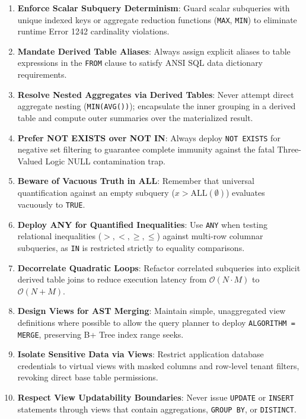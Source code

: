 \documentclass[10pt,twocolumn,letterpaper]{article}
\begin{document}
\begin{enumerate}
    \item \textbf{Enforce Scalar Subquery Determinism}: Guard scalar subqueries with unique indexed keys or aggregate reduction functions (\texttt{MAX}, \texttt{MIN}) to eliminate runtime Error 1242 cardinality violations.
    \item \textbf{Mandate Derived Table Aliases}: Always assign explicit aliases to table expressions in the \texttt{FROM} clause to satisfy ANSI SQL data dictionary requirements.
    \item \textbf{Resolve Nested Aggregates via Derived Tables}: Never attempt direct aggregate nesting (\texttt{MIN(AVG())}); encapsulate the inner grouping in a derived table and compute outer summaries over the materialized result.
    \item \textbf{Prefer NOT EXISTS over NOT IN}: Always deploy \texttt{NOT EXISTS} for negative set filtering to guarantee complete immunity against the fatal Three-Valued Logic NULL contamination trap.
    \item \textbf{Beware of Vacuous Truth in ALL}: Remember that universal quantification against an empty subquery ($x > \text{ALL}(\emptyset)$) evaluates vacuously to \texttt{TRUE}.
    \item \textbf{Deploy ANY for Quantified Inequalities}: Use \texttt{ANY} when testing relational inequalities ($>, <, \ge, \le$) against multi-row columnar subqueries, as \texttt{IN} is restricted strictly to equality comparisons.
    \item \textbf{Decorrelate Quadratic Loops}: Refactor correlated subqueries into explicit derived table joins to reduce execution latency from $\mathcal{O}(N \cdot M)$ to $\mathcal{O}(N + M)$.
    \item \textbf{Design Views for AST Merging}: Maintain simple, unaggregated view definitions where possible to allow the query planner to deploy \texttt{ALGORITHM = MERGE}, preserving B+ Tree index range seeks.
    \item \textbf{Isolate Sensitive Data via Views}: Restrict application database credentials to virtual views with masked columns and row-level tenant filters, revoking direct base table permissions.
    \item \textbf{Respect View Updatability Boundaries}: Never issue \texttt{UPDATE} or \texttt{INSERT} statements through views that contain aggregations, \texttt{GROUP BY}, or \texttt{DISTINCT}.
\end{enumerate}
\end{document}
